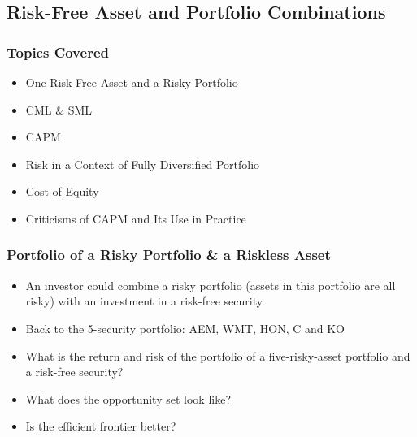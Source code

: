 \documentclass[9pt,aspectratio=169]{beamer}
\begin{document}
\subsection{Risk-Free Asset and Portfolio Combinations}

\begin{frame}



\frametitle{\textnormal{Topics Covered}}

\begin{itemize}

\item One Risk-Free Asset and a Risky Portfolio 
\item CML \& SML
\item CAPM
\item Risk in a Context of Fully Diversified Portfolio
\item Cost of Equity
\item Criticisms of CAPM and Its Use in Practice


\end{itemize}

\end{frame}





\begin{frame}

\frametitle{\textnormal{Portfolio of a Risky Portfolio \&  a Riskless Asset}}

\begin{itemize}

\item An investor could combine a risky portfolio (assets in this portfolio are all risky) with an investment in a risk-free security
\item Back to the 5-security portfolio: AEM, WMT, HON, C and KO
\item What is the return and risk of the portfolio of a five-risky-asset portfolio and a risk-free security?
\item What does the opportunity set look like?
\item Is the efficient frontier better?



 

\end{itemize}


\end{frame}
\end{document}
